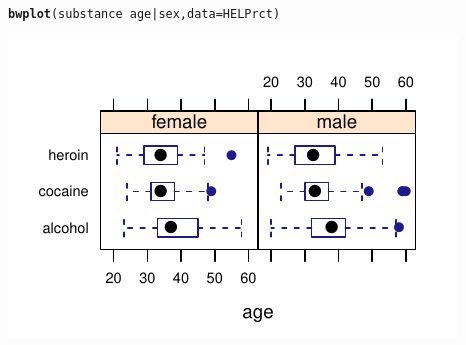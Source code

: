 \documentclass[twoside]{book}\usepackage[]{graphicx}\usepackage[]{xcolor}
\makeatletter
\def\maxwidth{ %
  \ifdim\Gin@nat@width>\linewidth
    \linewidth
  \else
    \Gin@nat@width
  \fi
}
\newcommand{\hlopt}[1]{\textcolor[rgb]{0,0,0}{#1}}%
\newcommand{\hlstd}[1]{\textcolor[rgb]{0.345,0.345,0.345}{#1}}%
\newcommand{\hlkwc}[1]{\textcolor[rgb]{0.333,0.667,0.333}{#1}}%
\newcommand{\hlkwd}[1]{\textcolor[rgb]{0.737,0.353,0.396}{\textbf{#1}}}%
\newenvironment{kframe}{%
 \def\at@end@of@kframe{}%
 \ifinner\ifhmode%
  \def\at@end@of@kframe{\end{minipage}}%
  \begin{minipage}{\columnwidth}%
 \fi\fi%
 \def\FrameCommand##1{\hskip\@totalleftmargin \hskip-\fboxsep
 \colorbox{shadecolor}{##1}\hskip-\fboxsep
     \hskip-\linewidth \hskip-\@totalleftmargin \hskip\columnwidth}%
 \MakeFramed {\advance\hsize-\width
   \@totalleftmargin\z@ \linewidth\hsize
   \@setminipage}}%
 {\par\unskip\endMakeFramed%
 \at@end@of@kframe}
\newenvironment{knitrout}{}{} %
\makeatother
\begin{document}
\begin{knitrout}
\color{fgcolor}\begin{kframe}
\begin{alltt}
\hlkwd{bwplot}\hlstd{(substance} \hlopt{~} \hlstd{age} \hlopt{|} \hlstd{sex,} \hlkwc{data} \hlstd{= HELPrct)}
\end{alltt}
\end{kframe}

{\centering \includegraphics[width=\maxwidth]{figures/fig-bwplot3-1} 

}



\end{knitrout}
\end{document}
